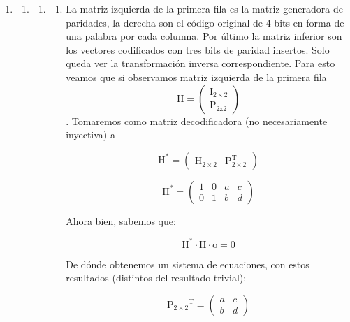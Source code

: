 \documentclass[
]{article}
\begin{document}
\begin{enumerate}
\def\labelenumi{\arabic{enumi}.}
\setcounter{enumi}{10}
\item
  \begin{enumerate}
  \def\labelenumii{\arabic{enumii}.}
  \item
    \begin{enumerate}
    \def\labelenumiii{\arabic{enumiii}.}
    \item
      \begin{enumerate}
      \def\labelenumiv{\arabic{enumiv}.}
      \item
        La matriz izquierda de la primera fila es la matriz generadora
        de paridades, la de\-recha son el código original de 4 bits en
        forma de una palabra por cada columna. Por último la matriz
        inferior son los vectores codificados con tres bits de paridad
        insertos. Solo queda ver la transformación inversa
        correspondiente. Para esto vea\-mos que si observamos matriz
        izquierda de la primera
        fila\[\mathtt{\mathrm{H}} = \begin{pmatrix}
        \mathtt{\mathrm{I_{2 \times 2}}} \\
        \mathtt{\mathrm{P_{2x2}}}
        \end{pmatrix}\]. Tomare\-mos como matriz decodificadora (no
        necesariamente inyectiva) a

        \[\mathtt{\mathrm{H}}^{\mathbf{\mathrm{\ast}}} = \begin{pmatrix}
        \mathtt{\mathrm{H_{2 \times 2}}} & \mathtt{\mathrm{P_{2 \times 2}^{T}}}
        \end{pmatrix}\]

        \[\mathtt{\mathrm{H^{\mathtt{\mathbf{\mathrm{\ast}}}}}} = \begin{pmatrix}
        1 & 0 & a & c \\
        0 & 1 & b & d
        \end{pmatrix}\]

        Ahora bien, sabemos que:

        \[{{\mathtt{\mathrm{H^{\mathbf{\mathrm{\ast}}}}} \cdot \mathtt{\mathrm{H}}} \cdot \mathtt{\mathrm{o}}} = \mathtt{\mathrm{0}}\]

        De dónde obtenemos un sistema de ecuaciones, con estos
        resultados (distintos del resultado trivial):

        \[\mathtt{\mathrm{{P_{2 \times 2}}^{\mathtt{\mathbf{\mathrm{T}}}}}} = \begin{pmatrix}
        a & c \\
        b & d
        \end{pmatrix}\]


\end{enumerate}
\end{enumerate}
\end{enumerate}
\end{enumerate}
\end{document}
